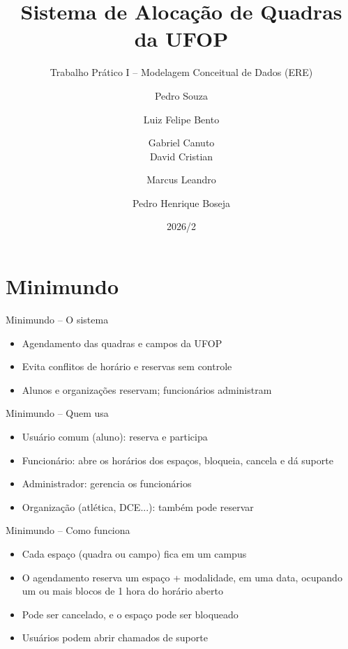 \documentclass[aspectratio=169,10pt]{beamer}
\title[TP I -- Modelagem Conceitual]{Sistema de Alocação de Quadras da UFOP}
\subtitle{Trabalho Prático I -- Modelagem Conceitual de Dados (ERE)}
\author[Pedro Souza et al.]{Pedro Souza \and Luiz Felipe Bento \and Gabriel Canuto \\ David Cristian \and Marcus Leandro \and Pedro Henrique Boseja}
\institute[UFOP]{BCC321 -- Banco de Dados I \\ Prof. Guilherme Tavares de Assis \\ DECOM / ICEB / UFOP}
\date{2026/2}
\begin{document}
\begin{frame}
  \titlepage
\end{frame}

\section{Minimundo}

\begin{frame}{Minimundo -- O sistema}
  \large
  \begin{itemize}
    \item Agendamento das quadras e campos da UFOP
    \item Evita conflitos de horário e reservas sem controle
    \item Alunos e organizações reservam; funcionários administram
  \end{itemize}
\end{frame}

\begin{frame}{Minimundo -- Quem usa}
  \large
  \begin{itemize}
    \item Usuário comum (aluno): reserva e participa
    \item Funcionário: abre os horários dos espaços, bloqueia, cancela e dá suporte
    \item Administrador: gerencia os funcionários
    \item Organização (atlética, DCE...): também pode reservar
  \end{itemize}
\end{frame}

\begin{frame}{Minimundo -- Como funciona}
  \large
  \begin{itemize}
    \item Cada espaço (quadra ou campo) fica em um campus
    \item O agendamento reserva um espaço + modalidade, em uma data,
          ocupando um ou mais blocos de 1 hora do horário aberto
    \item Pode ser cancelado, e o espaço pode ser bloqueado
    \item Usuários podem abrir chamados de suporte
  \end{itemize}
\end{frame}

\end{document}
